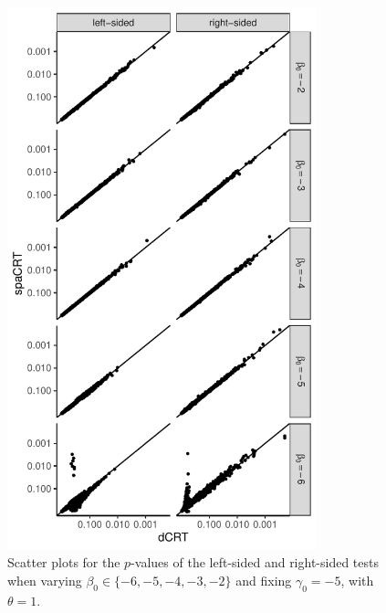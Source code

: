 \documentclass[12pt]{article}
\theoremstyle{definition}
\begin{document}
\begin{figure}
  \centering
  \includegraphics[width=0.8\textwidth]{figures-and-tables/simulation/QQ/plot-bin-NB-normal-B-50000-n-5000-5e3-n5-n5-disp-1full-dCRT-spaCRT-varying-beta.pdf}
  \caption{Scatter plots for the $p$-values of the left-sided and right-sided tests when varying $\beta_0\in \{-6,-5,-4,-3,-2\}$ and fixing $\gamma_0=-5$, with $\theta = 1$.}
  \label{fig:simulation-dot-plot-varying-beta-theta-1}
\end{figure}
\end{document}
